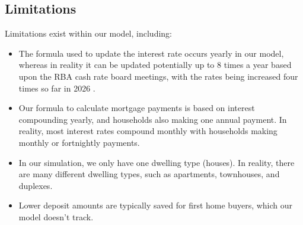 \documentclass[11pt]{article}
\begin{document}
\subsection{Limitations}
Limitations exist within our model, including:
\begin{itemize}
  \item The formula used to update the interest rate occurs yearly in our model, 
  whereas in reality it can be updated potentially up to 8 times a year based upon
  the RBA cash rate board meetings, with the rates being increased four times so far
  in 2026 \cite{canstarrates}. 
  \item Our formula to calculate mortgage payments is based on interest compounding
  yearly, and households also making one annual payment. In reality, most interest
  rates compound monthly with households making monthly or fortnightly payments.
  \item In our simulation, we only have one dwelling type (houses). In reality,
  there are many different dwelling types, such as apartments, townhouses, and
  duplexes.
  \item Lower deposit amounts are typically saved for first home buyers, which
  our model doesn't track.
  

\end{itemize}
\end{document}
